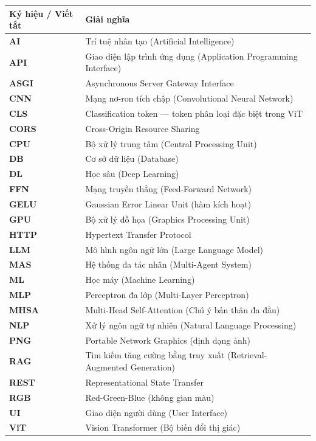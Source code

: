 \documentclass[13pt,a4paper]{extreport}
\begin{document}
\begin{longtable}{>{\bfseries}p{3.5cm} p{10cm}}
\toprule
\textbf{Ký hiệu / Viết tắt} & \textbf{Giải nghĩa} \\
\midrule
\endhead
AI   & Trí tuệ nhân tạo (Artificial Intelligence) \\[3pt]
API  & Giao diện lập trình ứng dụng (Application Programming Interface) \\[3pt]
ASGI & Asynchronous Server Gateway Interface \\[3pt]
CNN  & Mạng nơ-ron tích chập (Convolutional Neural Network) \\[3pt]
CLS  & Classification token --- token phân loại đặc biệt trong ViT \\[3pt]
CORS & Cross-Origin Resource Sharing \\[3pt]
CPU  & Bộ xử lý trung tâm (Central Processing Unit) \\[3pt]
DB   & Cơ sở dữ liệu (Database) \\[3pt]
DL   & Học sâu (Deep Learning) \\[3pt]
FFN  & Mạng truyền thẳng (Feed-Forward Network) \\[3pt]
GELU & Gaussian Error Linear Unit (hàm kích hoạt) \\[3pt]
GPU  & Bộ xử lý đồ họa (Graphics Processing Unit) \\[3pt]
HTTP & Hypertext Transfer Protocol \\[3pt]
LLM  & Mô hình ngôn ngữ lớn (Large Language Model) \\[3pt]
MAS  & Hệ thống đa tác nhân (Multi-Agent System) \\[3pt]
ML   & Học máy (Machine Learning) \\[3pt]
MLP  & Perceptron đa lớp (Multi-Layer Perceptron) \\[3pt]
MHSA & Multi-Head Self-Attention (Chú ý bản thân đa đầu) \\[3pt]
NLP  & Xử lý ngôn ngữ tự nhiên (Natural Language Processing) \\[3pt]
PNG  & Portable Network Graphics (định dạng ảnh) \\[3pt]
RAG  & Tìm kiếm tăng cường bằng truy xuất (Retrieval-Augmented Generation) \\[3pt]
REST & Representational State Transfer \\[3pt]
RGB  & Red-Green-Blue (không gian màu) \\[3pt]
UI   & Giao diện người dùng (User Interface) \\[3pt]
ViT  & Vision Transformer (Bộ biến đổi thị giác) \\[3pt]
\bottomrule
\end{longtable}
\end{document}
